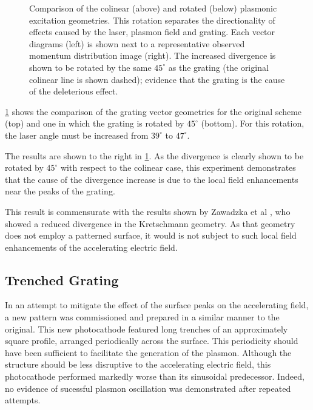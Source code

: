 \begin{figure}
  \centering
  
  \caption[Comparison of the colinear and rotated plasmonic excitation geometries]{
    Comparison of the colinear (above) and rotated (below) plasmonic excitation geometries.
    This rotation separates the directionality of effects caused by the laser, plasmon field and grating.
    Each vector diagrams (left) is shown next to a representative observed momentum distribution image (right).
    The increased divergence is shown to be rotated by the same $45^{\circ}$ as the grating (the original colinear line is shown dashed); evidence that the grating is the cause of the deleterious effect.
  }
  \label{fig:rotated}
\end{figure}

\ref{fig:rotated} shows the comparison of the grating vector geometries for the original scheme (top) and one in which the grating is rotated by $45^{\circ}$ (bottom).
For this rotation, the laser angle must be increased from $39^{\circ}$ to $47^{\circ}$.

The results are shown to the right in \ref{fig:rotated}.
As the divergence is clearly shown to be rotated by $45^{\circ}$ with respect to the colinear case, this experiment demonstrates that the cause of the divergence increase is due to the local field enhancements near the peaks of the grating.

This result is commensurate with the results shown by Zawadzka et al \cite{zawadzka_evanescent_2001}, who showed a reduced divergence in the Kretschmann geometry.
As that geometry does not employ a patterned surface, it would is not subject to such local field enhancements of the accelerating electric field.

\subsection{Trenched Grating}

In an attempt to mitigate the effect of the surface peaks on the accelerating field, a new pattern was commissioned and prepared in a similar manner to the original.
This new photocathode featured long trenches of an approximately square profile, arranged periodically across the surface.
This periodicity should have been sufficient to facilitate the generation of the plasmon.
Although the structure should be less disruptive to the accelerating electric field, this photocathode performed markedly worse than its sinusoidal predecessor.
Indeed, no evidence of sucessful plasmon oscillation was demonstrated after repeated attempts.

